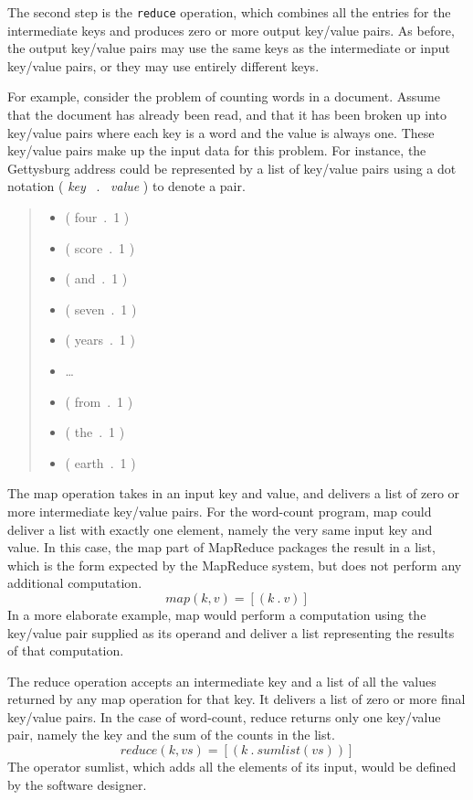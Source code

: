 The second step is the \texttt{reduce} operation, which
combines all the entries for the intermediate keys and
produces zero or more output key/value pairs.  As before, the
output key/value pairs may use the same keys as the
intermediate or input key/value pairs, or they may use
entirely different keys.

For example, consider the problem of counting words in a
document.  Assume that the document has already been
read, and that it has been broken up into key/value pairs
where each key is a word and the value is always one. These
key/value pairs make up the input data for this problem. For
instance, the Gettysburg address could be represented by a
list of key/value pairs using a dot notation ( \emph{key} ~.~ \emph{value} )
to denote a pair.
\begin{quote}
\begin{itemize}
\item ( four~.~1 )
\item ( score~.~1 )
\item ( and~.~1 )
\item ( seven~.~1 )
\item ( years~.~1 )
\item \dots
\item ( from~.~1 )
\item ( the~.~1 )
\item ( earth~.~1 )
\end{itemize}
\end{quote}

The map operation takes in an input key and
value, and delivers a list of zero or more intermediate
key/value pairs.  For the word-count program, map could
deliver a list with exactly one element, namely
the very same input key and value.
In this case, the map part of MapReduce
packages the result in a list, which is
the form expected by the MapReduce system,
but does not perform any additional computation.
\begin{displaymath}
map(k, v) = [ ( k ~.~ v ) ]
\end{displaymath}
In a more elaborate example, map would perform
a computation using the key/value pair supplied as
its operand and deliver a list representing the results
of that computation.

The reduce operation accepts an intermediate key and a list of
all the values returned by any map operation for that key.
It delivers a list of zero or more final key/value pairs.
In the case of word-count, reduce returns only one key/value pair,
namely the key and the sum of the counts in the list.
\begin{displaymath}
reduce(k, vs) = [ ( k ~.~ sumlist(vs) ) ]
\end{displaymath}
The operator sumlist, which adds all the elements of its
input, would be defined by the software designer.

